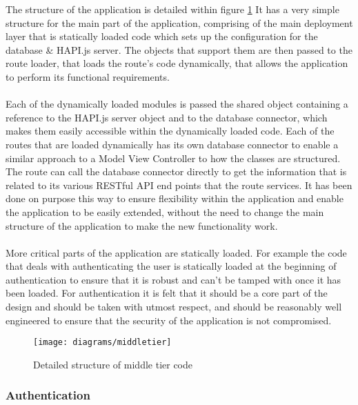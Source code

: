 The structure of the application is detailed within figure \ref{fig:middle_tier_code} It has a very simple structure for the main part of the application, comprising of the main deployment layer that is statically loaded code which sets up the configuration for the database \& HAPI.js server. The objects that support them are then passed to the route loader, that loads the route's code dynamically, that allows the application to perform its functional requirements.\\
\\
Each of the dynamically loaded modules is passed the shared object containing a reference to the HAPI.js server object and to the database connector, which makes them easily accessible within the dynamically loaded code. Each of the routes that are loaded dynamically has its own database connector to enable a similar approach to a Model View Controller to how the classes are structured. The route can call the database connector directly to get the information that is related to its various RESTful API end points that the route services. It has been done on purpose this way to ensure flexibility within the application and enable the application to be easily extended, without the need to change the main structure of the application to make the new functionality work.\\
\\
More critical parts of the application are statically loaded. For example the code that deals with authenticating the user is statically loaded at the beginning of authentication to ensure that it is robust and can't be tamped with once it has been loaded. For authentication it is felt that it should be a core part of the design and should be taken with utmost respect, and should be reasonably well engineered to ensure that the security of the application is not compromised.
 
\begin{figure}[H]
    \centering
    \texttt{[image: diagrams/middletier]}
    \caption{Detailed structure of middle tier code}
    \label{fig:middle_tier_code}
\end{figure} 

\subsubsection{Authentication}

